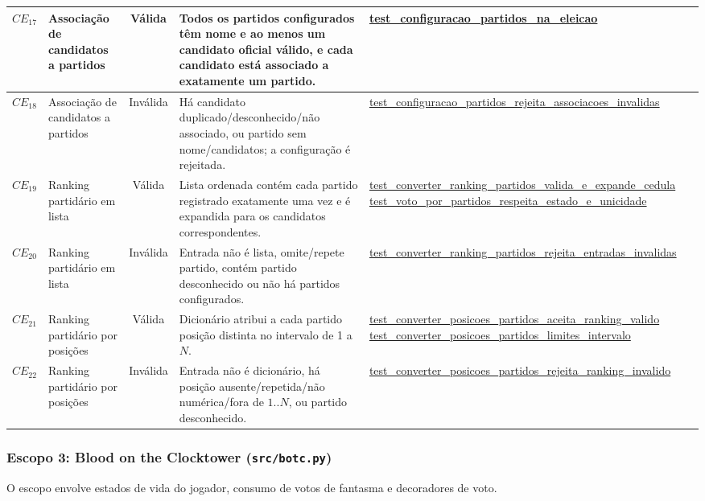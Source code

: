 \documentclass[12pt,a4paper]{article}
\begin{document}
\begin{xltabular}{\textwidth}{|l|Y|c|Y|Y|}
$CE_{17}$ & Associação de candidatos a partidos & Válida &
Todos os partidos configurados têm nome e ao menos um candidato oficial válido, e cada candidato está associado a exatamente um partido. &
\url{test\_configuracao\_partidos\_na\_eleicao} \\ \hline

$CE_{18}$ & Associação de candidatos a partidos & Inválida &
Há candidato duplicado/desconhecido/não associado, ou partido sem nome/candidatos; a configuração é rejeitada. &
\url{test\_configuracao\_partidos\_rejeita\_associacoes\_invalidas} \\ \hline

$CE_{19}$ & Ranking partidário em lista & Válida &
Lista ordenada contém cada partido registrado exatamente uma vez e é expandida para os candidatos correspondentes. &
\url{test\_converter\_ranking\_partidos\_valida\_e\_expande\_cedula}
\newline
\newline
\url{test\_voto\_por\_partidos\_respeita\_estado\_e\_unicidade} \\ \hline

$CE_{20}$ & Ranking partidário em lista & Inválida &
Entrada não é lista, omite/repete partido, contém partido desconhecido ou não há partidos configurados. &
\url{test\_converter\_ranking\_partidos\_rejeita\_entradas\_invalidas} \\ \hline

$CE_{21}$ & Ranking partidário por posições & Válida &
Dicionário atribui a cada partido posição distinta no intervalo de 1 a $N$. &
\url{test\_converter\_posicoes\_partidos\_aceita\_ranking\_valido}
\newline
\newline
\url{test\_converter\_posicoes\_partidos\_limites\_intervalo} \\ \hline

$CE_{22}$ & Ranking partidário por posições & Inválida &
Entrada não é dicionário, há posição ausente/repetida/não numérica/fora de $1..N$, ou partido desconhecido. &
\url{test\_converter\_posicoes\_partidos\_rejeita\_ranking\_invalido} \\ \hline

\end{xltabular}
\normalsize


\subsubsection{Escopo 3: Blood on the Clocktower (\texttt{src/botc.py})}
O escopo envolve estados de vida do jogador, consumo de votos de fantasma e decoradores de voto.
\end{document}
